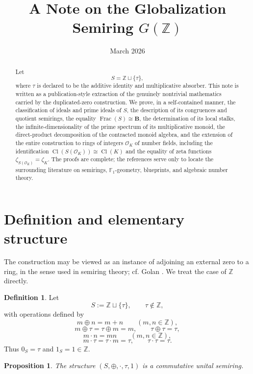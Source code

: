 \documentclass[11pt]{article}
\title{A Note on the Globalization Semiring \texorpdfstring{$G(\mathbb Z)$}{G(Z)}}
\author{}
\date{March 2026}
\newtheorem{proposition}[theorem]{Proposition}
\theoremstyle{definition}
\newtheorem{definition}[theorem]{Definition}
\newcommand{\Z}{\mathbb Z}
\newcommand{\B}{\mathbf B}
\newcommand{\Frac}{\operatorname{Frac}}
\newcommand{\Cl}{\operatorname{Cl}}
\newcommand{\taup}{\tau}
\newcommand{\OK}{\mathcal O_K}
\begin{document}
\maketitle

\begin{abstract}
Let
\[
S=\Z\sqcup\{\taup\},
\]
where \(\taup\) is declared to be the additive identity and multiplicative absorber.  This note is written as a publication-style extraction of the genuinely nontrivial mathematics carried by the duplicated-zero construction.  We prove, in a self-contained manner, the classification of ideals and prime ideals of \(S\), the description of its congruences and quotient semirings, the equality \(\Frac(S)\cong \B\), the determination of its local stalks, the infinite-dimensionality of the prime spectrum of its multiplicative monoid, the direct-product decomposition of the contracted monoid algebra, and the extension of the entire construction to rings of integers \(\OK\) of number fields, including the identification \(\Cl(S(\OK))\cong \Cl(K)\) and the equality of zeta functions \(\zeta_{S(\OK)}=\zeta_K\).  The proofs are complete; the references serve only to locate the surrounding literature on semirings, \(\mathbb F_1\)-geometry, blueprints, and algebraic number theory.
\end{abstract}

\tableofcontents

\section{Definition and elementary structure}

The construction may be viewed as an instance of adjoining an external zero to a ring, in the sense used in semiring theory; cf. Golan \cite[Chs.~1, 6--8]{golan}.  We treat the case of \(\Z\) directly.

\begin{definition}
Let
\[
S:=\Z\sqcup\{\taup\},\qquad \taup\notin \Z,
\]
with operations defined by
\[
m\oplus n=m+n\qquad (m,n\in\Z),
\]
\[
m\oplus \taup=\taup\oplus m=m,\qquad \taup\oplus\taup=\taup,
\]
\[
m\cdot n=mn\qquad (m,n\in\Z),
\]
\[
m\cdot \taup=\taup\cdot m=\taup,\qquad \taup\cdot\taup=\taup.
\]
Thus \(0_S=\taup\) and \(1_S=1\in\Z\).
\end{definition}

\begin{proposition}\label{prop:basic-semiring}
The structure \((S,\oplus,\cdot,\taup,1)\) is a commutative unital semiring.
\end{proposition}
\end{document}
